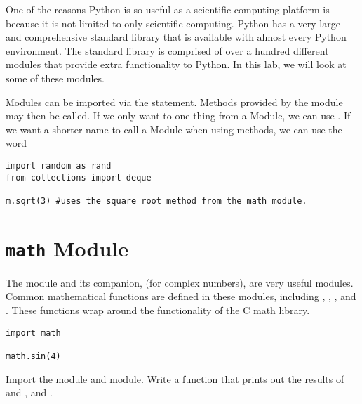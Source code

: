 
One of the reasons Python is so useful as a scientific computing platform is because it is not limited to only scientific computing.
Python has a very large and comprehensive standard library that is available with almost every Python environment.
The standard library is comprised of over a hundred different modules that provide extra functionality to Python.
In this lab, we will look at some of these modules.

Modules can be imported via the  statement. Methods provided by the module may then be called.
If we only want to one thing from a Module, we can use .
If we want a shorter name to call a Module when using methods, we can use the word 

\begin{lstlisting}
import random as rand
from collections import deque

m.sqrt(3) #uses the square root method from the math module.
\end{lstlisting}

\section*{\texttt{math} Module}
The  module and its companion,  (for complex numbers), are very useful modules.
Common mathematical functions are defined in these modules, including , , , and .
These functions wrap around the functionality of the C math library.

\begin{lstlisting}
import math

math.sin(4)
\end{lstlisting}

\begin{problem}
Import the  module and  module. Write a function that prints out the results of  and , and .
\end{problem}

